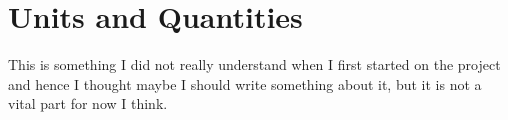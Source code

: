 \section{Units and Quantities}
\color{red}
This is something I did not really understand when I first started on the project and hence I thought maybe I should write something about it, but it is not a vital part for now I think.
\color{black}